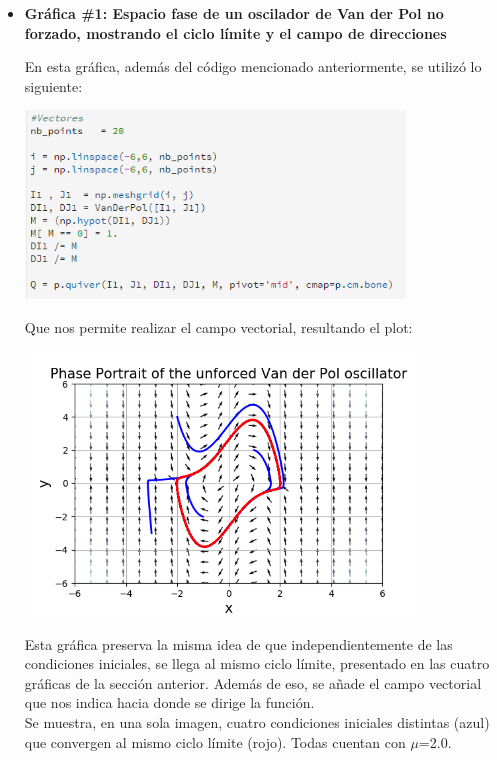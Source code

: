 \documentclass[12pt]{article}
\begin{document}
\begin{itemize}
\item \textbf{Gráfica \#1: Espacio fase de un oscilador de Van der Pol no forzado, mostrando el ciclo límite y el campo de direcciones}

En esta gráfica, además del código mencionado anteriormente, se utilizó lo siguiente:

\begin{center}
        \includegraphics[height=5cm]{3.png}
\end{center}

Que nos permite realizar el campo vectorial, resultando el plot:

\begin{center}
        \includegraphics[height=7cm]{Graf1.png}
\end{center}

Esta gráfica preserva la misma idea de que independientemente de las condiciones iniciales, se llega al mismo ciclo límite, presentado en las cuatro gráficas de la sección anterior. Además de eso, se añade el campo vectorial que nos indica hacia donde se dirige la función. \\

Se muestra, en una sola imagen, cuatro condiciones iniciales distintas (azul) que convergen al mismo ciclo límite (rojo). Todas cuentan con $\mu$=2.0.


\end{itemize}
\end{document}
